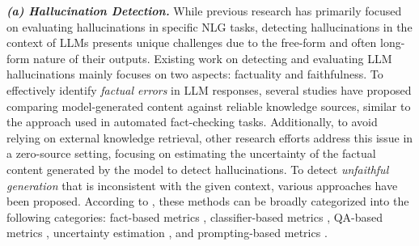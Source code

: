 \textbf{\textit{(a) Hallucination Detection.}}
While previous research has primarily focused on evaluating hallucinations in specific NLG tasks, detecting hallucinations in the context of LLMs presents unique challenges due to the free-form and often long-form nature of their outputs. Existing work on detecting and evaluating LLM hallucinations mainly focuses on two aspects: factuality and faithfulness. To effectively identify \textit{factual errors} in LLM responses, several studies \cite{min2023factscore, chern2023factool, gou2023critic, wang2023explainable, chen2023complex, huo2023retrieving} have proposed comparing model-generated content against reliable knowledge sources, similar to the approach used in automated fact-checking tasks. Additionally, to avoid relying on external knowledge retrieval, other research efforts \cite{varshney2023stitch, yao2023llm, luo2023zero, xiong2023can, kadavath2022language, manakul2023selfcheckgpt, agrawal2023language, cohen2023lm} address this issue in a zero-source setting, focusing on estimating the uncertainty of the factual content generated by the model to detect hallucinations. To detect \textit{unfaithful generation} that is inconsistent with the given context, various approaches have been proposed. According to \cite{huang2023survey}, these methods can be broadly categorized into the following categories: fact-based metrics \cite{lin2004rouge, nan2021entity, maynez2020faithfulness, wang2020towards, goodrich2019assessing, shuster2021retrieval}, classifier-based metrics \cite{mishra2021looking, barrantes2020adversarial, goyal2020evaluating, laban2022summac, kryscinski2019evaluating, zhou2020detecting,dziri2022evaluating}, QA-based metrics \cite{durmus2020feqa, wang2020asking, scialom2021questeval, fabbri2021qafacteval}, uncertainty estimation \cite{xiao2021hallucination, guerreiro2022looking, xiong2023can, xu2020understanding}, and prompting-based metrics \cite{wang2023chatgpt, luo2023chatgpt, laban2023llms, adlakha2023evaluating, gao2023human}.

